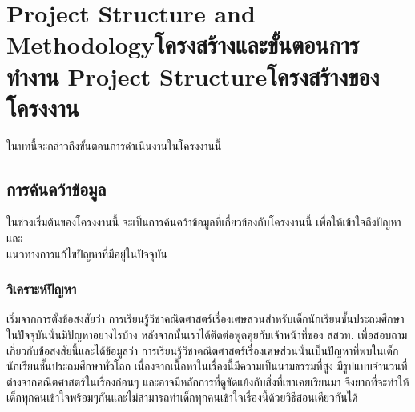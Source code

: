 \chapter{\ifproject%
\ifenglish Project Structure and Methodology\else โครงสร้างและขั้นตอนการทำงาน\fi
\else%
\ifenglish Project Structure\else โครงสร้างของโครงงาน\fi
\fi
}

ในบทนี้จะกล่าวถึงขั้นตอนการดำเนินงานในโครงงานนี้

\makeatletter


\makeatother

\section{การค้นคว้าข้อมูล}
ในช่วงเริ่มต้นของโครงงานนี้ จะเป็นการค้นคว้าข้อมูลที่เกี่ยวข้องกับโครงงานนี้ เพื่อให้เข้าใจถึงปัญหาและ\\
แนวทางการแก้ไขปัญหาที่มีอยู่ในปัจจุบัน

\subsection{วิเคราะห์ปัญหา}
 เริ่มจากการตั้งข้อสงสัยว่า การเรียนรู้วิชาคณิตศาสตร์เรื่องเศษส่วนสำหรับเด็กนักเรียนชั้นประถมศึกษาในปัจจุบันนั้นมีปัญหาอย่างไรบ้าง
 หลังจากนั้นเราได้ติดต่อพูดคุยกับเจ้าหน้าที่ของ สสวท. เพื่อสอบถามเกี่ยวกับข้อสงสัยนี้และได้ข้อมูลว่า การเรียนรู้วิชาคณิตศาสตร์เรื่องเศษส่วนนั้นเป็นปัญหาที่พบในเด็กนักเรียนชั้นประถมศึกษาทั่วโลก
 เนื่องจากเนื้อหาในเรื่องนี้มีความเป็นนามธรรมที่สูง มีรูปแบบจำนวนที่ต่างจากคณิตศาสตร์ในเรื่องก่อนๆ และอาจมีหลักการที่ดูขัดแย้งกับสิ่งที่เขาเคยเรียนมา จึงยากที่จะทำให้เด็กทุกคนเข้าใจพร้อมๆกันและไม่สามารถทำเด็กทุกคนเข้าใจเรื่องนี้ด้วยวิธีสอนเดียวกันได้

